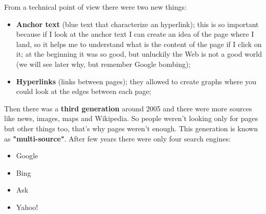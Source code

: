 From a technical point of view there were two new things:
\begin{itemize}
    \item \textbf{Anchor text} (blue text that characterize an hyperlink); this is so important because if I look at the anchor text I can create an idea of the page where I land, so it helps me to understand what is the content of the page if I click on it; at the beginning it was so good, but unluckily the Web is not a good world (we will see later why, but remember Google bombing);
    \item \textbf{Hyperlinks} (links between pages); they allowed to create graphs where you could look at the edges between each page;
\end{itemize}
Then there was a \textbf{third generation} around 2005 and there were more sources like news, images, maps and Wikipedia. So people weren't looking only for pages but other things too, that's why pages weren't enough. This generation is known as \textbf{"multi-source"}.\newline
After few years there were only four search engines:
\begin{itemize}
    \item Google
    \item Bing
    \item Ask
    \item Yahoo!
\end{itemize}

